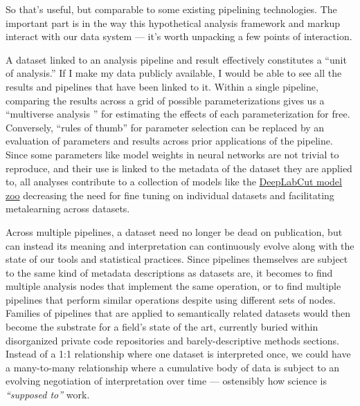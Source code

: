 So that's useful, but comparable to some existing pipelining
technologies. The important part is in the way this hypothetical
analysis framework and markup interact with our data system --- it's
worth unpacking a few points of interaction.

A dataset linked to an analysis pipeline and result effectively
constitutes a ``unit of analysis.'' If I make my data publicly
available, I would be able to see all the results and pipelines that
have been linked to it. Within a single pipeline, comparing the results
across a grid of possible parameterizations gives us a ``multiverse
analysis \citep{steegenIncreasingTransparencyMultiverse2016} ''
for estimating the effects of each parameterization for free.
Conversely, ``rules of thumb'' for parameter selection can be replaced
by an evaluation of parameters and results across prior applications of
the pipeline. Since some parameters like model weights in neural
networks are not trivial to reproduce, and their use is linked to the
metadata of the dataset they are applied to, all analyses contribute to
a collection of models like the
\href{http://www.mackenziemathislab.org/dlc-modelzoo}{DeepLabCut model
zoo} decreasing the need for fine tuning on individual datasets and
facilitating metalearning across datasets.

Across multiple pipelines, a dataset need no longer be dead on
publication, but can instead its meaning and interpretation can
continuously evolve along with the state of our tools and statistical
practices. Since pipelines themselves are subject to the same kind of
metadata descriptions as datasets are, it becomes to find multiple
analysis nodes that implement the same operation, or to find multiple
pipelines that perform similar operations despite using different sets
of nodes. Families of pipelines that are applied to semantically related
datasets would then become the substrate for a field's state of the art,
currently buried within disorganized private code repositories and
barely-descriptive methods sections. Instead of a 1:1 relationship where
one dataset is interpreted once, we could have a many-to-many
relationship where a cumulative body of data is subject to an evolving
negotiation of interpretation over time --- ostensibly how science is
\emph{``supposed to''} work.

